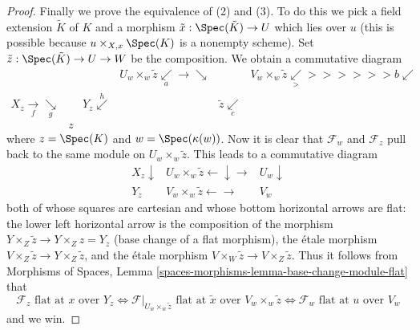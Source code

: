 \begin{proof}
\medskip\noindent
Finally we prove the equivalence of (2) and (3).
To do this we pick a field extension $\tilde K$ of $K$
and a morphism $\tilde x : \Spec(\tilde K) \to U$ which
lies over $u$ (this is possible because $u \times_{X, x} \Spec(K)$
is a nonempty scheme). Set $\tilde z : \Spec(\tilde K) \to U \to W$
be the composition. We obtain a commutative diagram
$$
\begin{array}{cccccc} &  &  & U_w \times_w \tilde z \underset{a}{\swarrow}\longrightarrow\searrow &  & V_w \times_w \tilde z \underset{>}{\swarrow}>>>>>>b \swarrow \\ X_z \underset{f}{\longrightarrow}\underset{g}{\searrow} &  & Y_z \overset{h}{\swarrow} &  & \tilde z \underset{c}{\swarrow} &  \\  & z &  &  &  & \end{array}
$$
where $z = \Spec(K)$ and $w = \Spec(\kappa(w))$. Now it
is clear that $\mathcal{F}_w$ and $\mathcal{F}_z$ pull back to the
same module on $U_w \times_w \tilde z$. This leads to a commutative
diagram
$$
\begin{array}{ccc}X_z \downarrow & U_w \times_w \tilde z \longleftarrow\downarrow\longrightarrow & U_w \downarrow \\ Y_z & V_w \times_w \tilde z \longleftarrow\longrightarrow & V_w\end{array}
$$
both of whose squares are cartesian and whose bottom horizontal
arrows are flat: the lower left horizontal arrow is the composition
of the morphism $Y \times_Z \tilde z \to Y \times_Z z = Y_z$ (base change
of a flat morphism), the \'etale morphism
$V \times_Z \tilde z \to Y \times_Z \tilde z$, and
the \'etale morphism $V \times_W \tilde z \to V \times_Z \tilde z$.
Thus it follows from
Morphisms of Spaces,
Lemma \ref{spaces-morphisms-lemma-base-change-module-flat}
that
$$
\mathcal{F}_z\text{ flat at }x\text{ over }Y_z
\Leftrightarrow
\mathcal{F}|_{U_w \times_w \tilde z}
\text{ flat at }\tilde x\text{ over }V_w \times_w \tilde z
\Leftrightarrow
\mathcal{F}_w\text{ flat at }u\text{ over }V_w
$$
and we win.
\end{proof}

